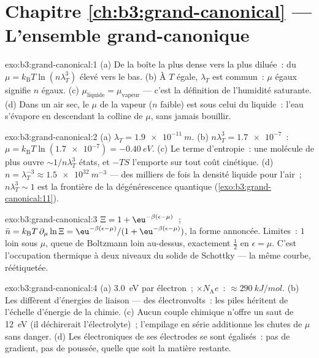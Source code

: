\section*{Chapitre \ref{ch:b3:grand-canonical} --- L'ensemble grand-canonique}

\begin{solution}{exo:b3:grand-canonical:1}
(a) De la boîte la plus dense vers la plus diluée~: du $\mu =
k_{\text{B}}T\ln(n\lambda_T^3)$ élevé vers le bas. (b) À $T$ égale,
$\lambda_T$ est commun~: $\mu$ égaux signifie $n$ égaux. (c)
$\mu_{\text{liquide}} = \mu_{\text{vapeur}}$ --- c'est la définition
de l'humidité saturante. (d) Dans un air sec, le $\mu$ de la vapeur
($n$ faible) est sous celui du liquide~: l'eau s'évapore en
descendant la colline de $\mu$, sans jamais bouillir.
\end{solution}

\begin{solution}{exo:b3:grand-canonical:2}
(a) $\lambda_T = \qty{1.9e-11}{m}$. (b) $n\lambda_T^3 =
\num{1.7e-7}$~: $\mu = k_{\text{B}}T\ln(\num{1.7e-7}) =
\qty{-0.40}{eV}$. (c) Le terme d'entropie~: une molécule de plus
ouvre $\sim1/n\lambda_T^3$ états, et $-TS$ l'emporte sur tout coût
cinétique. (d) $n = \lambda_T^{-3} \approx \qty{1.5e32}{m^{-3}}$ ---
des milliers de fois la densité liquide pour l'air~; $n\lambda_T^3 \sim 1$
est la frontière de la dégénérescence quantique
(\cref{exo:b3:grand-canonical:11}).
\end{solution}

\begin{solution}{exo:b3:grand-canonical:3}
$\Xi = 1 + \eu^{-\beta(\epsilon-\mu)}$~; $\bar n = k_{\text{B}}T\,
\partial_\mu\ln\Xi = \eu^{-\beta(\epsilon-\mu)}/(1 +
\eu^{-\beta(\epsilon-\mu)})$, la forme annoncée. Limites~: $1$ loin
sous $\mu$, queue de Boltzmann loin au-dessus, exactement $\tfrac12$
en $\epsilon = \mu$. C'est l'occupation thermique à deux niveaux du
solide de Schottky --- la même courbe, réétiquetée.
\end{solution}

\begin{solution}{exo:b3:grand-canonical:4}
(a) \qty{3.0}{eV} par électron~; $\times N_{\text{A}}e$~:
$\approx\qty{290}{kJ/mol}$. (b) Les  diffèrent
d'énergies de liaison --- des électronvolts~: les piles héritent de
l'échelle d'énergie de la chimie. (c) Aucun couple chimique n'offre
un saut de \qty{12}{eV} (il déchirerait l'électrolyte)~; l'empilage
en série additionne les chutes de $\mu$ sans danger. (d) Les
 électroniques de ses électrodes se sont
égalisés~: pas de gradient, pas de poussée, quelle que soit la
matière restante.
\end{solution}

